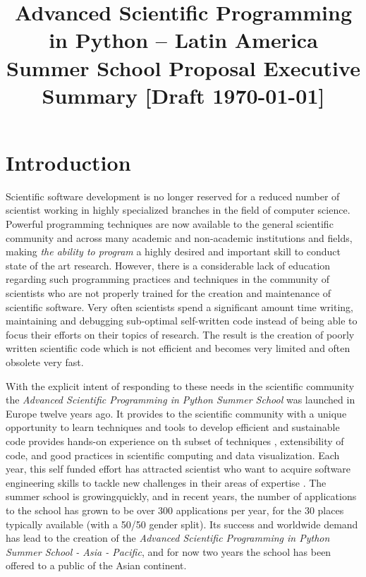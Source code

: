 \documentclass{article}[11pt]
\title{%
\Large Advanced Scientific Programming in Python  -- Latin America
\\ \vspace{0.2cm}
\large Summer School Proposal  Executive Summary  [Draft \today]}
\date{}
\author{}
\begin{document}
\maketitle


\vspace*{-1.2cm}
\section*{Introduction}
Scientific software development is no longer reserved for a reduced number of
scientist working in highly specialized branches in the field of computer
science. Powerful programming techniques are now available to the general
scientific community and across many academic and non-academic institutions and
fields, making \emph{the ability to program} a highly desired and important
skill to conduct state of the art research. However, there is a considerable
lack of education regarding such programming practices and techniques in
the community of scientists who are  not properly trained for the
creation and maintenance of scientific software. Very often scientists spend
 a significant amount  time writing, maintaining and debugging
sub-optimal self-written code instead of being
able to focus their efforts on their topics of research. The result is the
creation of poorly written scientific code which is not efficient and becomes
very limited and often obsolete very fast.

With the explicit intent of responding to these needs in the scientific
community the \emph{Advanced Scientific Programming in Python Summer School}
was launched in Europe twelve years ago. It provides to the scientific community
with a unique opportunity to learn techniques and tools to develop efficient
and sustainable code provides hands-on experience on th subset of  techniques , extensibility of code,
and good practices in scientific computing and data visualization. Each year,
this self funded effort has attracted scientist who want to acquire software
engineering skills to tackle new challenges in their areas of expertise . The summer school  {is growing}quickly, and
in recent years, the number of applications to the school has grown to be over
300 applications per year, for the 30 places typically available (with a 50/50
gender split). Its success and worldwide demand has lead to the creation of the
\emph{Advanced Scientific Programming in Python Summer School - Asia -
Pacific}, and for now two years the school has been offered to a public of the
Asian continent. 
\end{document}
